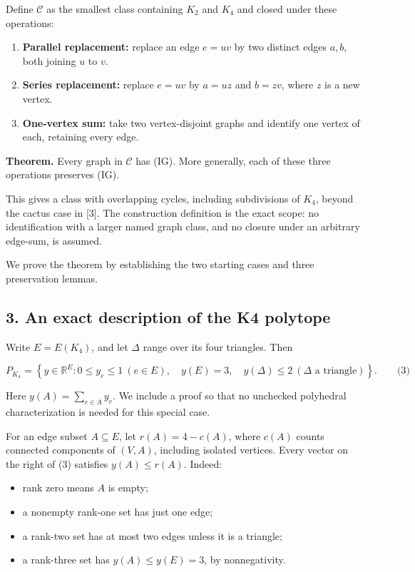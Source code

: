 \documentclass{article}
\begin{document}
Define \(\mathcal C\) as the smallest class containing \(K_2\) and \(K_4\) and closed under these operations:

\begin{enumerate}
\def\labelenumi{\arabic{enumi}.}
\item
  \textbf{Parallel replacement:} replace an edge \(e=uv\) by two distinct edges \(a,b\), both joining \(u\) to \(v\).
\item
  \textbf{Series replacement:} replace \(e=uv\) by \(a=uz\) and \(b=zv\), where \(z\) is a new vertex.
\item
  \textbf{One-vertex sum:} take two vertex-disjoint graphs and identify one vertex of each, retaining every edge.
\end{enumerate}

\textbf{Theorem.} Every graph in \(\mathcal C\) has (IG). More generally, each of these three operations preserves (IG).

This gives a class with overlapping cycles, including subdivisions of \(K_4\), beyond the cactus case in [3]. The construction definition is the exact scope: no identification with a larger named graph class, and no closure under an arbitrary edge-sum, is assumed.

We prove the theorem by establishing the two starting cases and three preservation lemmas.

\subsection{3. An exact description of the K4 polytope}

Write \(E=E(K_4)\), and let \(\Delta\) range over its four triangles. Then

\[
P_{K_4}=\left\{y\in\mathbb R^E:
0\le y_e\le1\ (e\in E),\quad
y(E)=3,\quad y(\Delta)\le2\ (\Delta\text{ a triangle})\right\}.\qquad\text{(3)}
\]

Here \(y(A)=\sum_{e\in A}y_e\). We include a proof so that no unchecked polyhedral characterization is needed for this special case.

For an edge subset \(A\subseteq E\), let \(r(A)=4-c(A)\), where \(c(A)\) counts connected components of \((V,A)\), including isolated vertices. Every vector on the right of (3) satisfies \(y(A)\le r(A)\). Indeed:

\begin{itemize}
\item
  rank zero means \(A\) is empty;
\item
  a nonempty rank-one set has just one edge;
\item
  a rank-two set has at most two edges unless it is a triangle;
\item
  a rank-three set has \(y(A)\le y(E)=3\), by nonnegativity.
\end{itemize}
\end{document}
